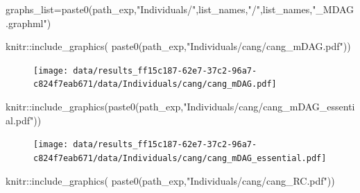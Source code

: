 \documentclass[
  letterpaper,
  DIV=11,
  numbers=noendperiod]{scrreprt}
\newenvironment{Shaded}{\begin{snugshade}}{\end{snugshade}}
\newcommand{\FunctionTok}[1]{\textcolor[rgb]{0.28,0.35,0.67}{#1}}
\newcommand{\NormalTok}[1]{\textcolor[rgb]{0.00,0.23,0.31}{#1}}
\newcommand{\OtherTok}[1]{\textcolor[rgb]{0.00,0.23,0.31}{#1}}
\newcommand{\SpecialCharTok}[1]{\textcolor[rgb]{0.37,0.37,0.37}{#1}}
\newcommand{\StringTok}[1]{\textcolor[rgb]{0.13,0.47,0.30}{#1}}
\begin{document}
\begin{Shaded}
\begin{Highlighting}[]
\NormalTok{graphs\_list}\OtherTok{=}\FunctionTok{paste0}\NormalTok{(path\_exp,}\StringTok{"Individuals/"}\NormalTok{,list\_names,}\StringTok{"/"}\NormalTok{,list\_names,}\StringTok{"\_MDAG.graphml"}\NormalTok{)}
\end{Highlighting}
\end{Shaded}

\begin{Shaded}
\begin{Highlighting}[]
\NormalTok{knitr}\SpecialCharTok{::}\FunctionTok{include\_graphics}\NormalTok{(}
  \FunctionTok{paste0}\NormalTok{(path\_exp,}\StringTok{"Individuals/cang/cang\_mDAG.pdf"}\NormalTok{))}
\end{Highlighting}
\end{Shaded}

\begin{figure}[H]

{\centering \texttt{[image: data/results\_ff15c187-62e7-37c2-96a7-c824f7eab671/data/Individuals/cang/cang\_mDAG.pdf]}

}

\end{figure}

\begin{Shaded}
\begin{Highlighting}[]
\NormalTok{knitr}\SpecialCharTok{::}\FunctionTok{include\_graphics}\NormalTok{(}\FunctionTok{paste0}\NormalTok{(path\_exp,}\StringTok{"Individuals/cang/cang\_mDAG\_essential.pdf"}\NormalTok{))}
\end{Highlighting}
\end{Shaded}

\begin{figure}[H]

{\centering \texttt{[image: data/results\_ff15c187-62e7-37c2-96a7-c824f7eab671/data/Individuals/cang/cang\_mDAG\_essential.pdf]}

}

\end{figure}

\begin{Shaded}
\begin{Highlighting}[]
\NormalTok{knitr}\SpecialCharTok{::}\FunctionTok{include\_graphics}\NormalTok{(}
  \FunctionTok{paste0}\NormalTok{(path\_exp,}\StringTok{"Individuals/cang/cang\_RC.pdf"}\NormalTok{))}
\end{Highlighting}
\end{Shaded}
\end{document}

